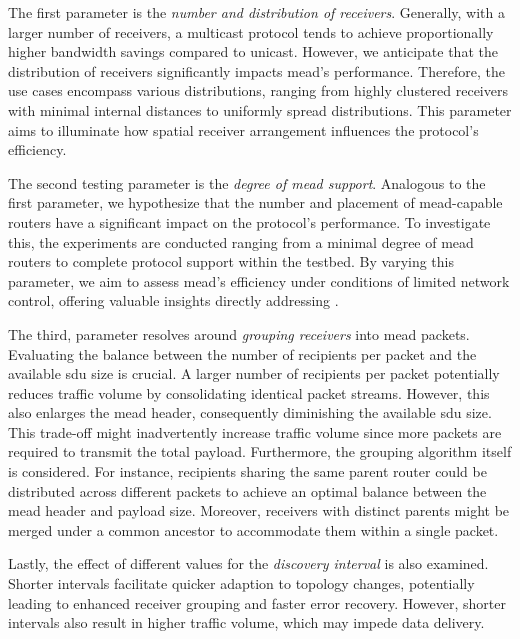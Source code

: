 The first parameter is the \textit{number and distribution of receivers}.
Generally, with a larger number of receivers, a multicast protocol tends to
    achieve proportionally higher bandwidth savings compared to unicast.
However, we anticipate that the distribution of receivers significantly impacts
    \gls{mead}'s performance.
Therefore, the use cases encompass various distributions, ranging from highly
    clustered receivers with minimal internal distances to uniformly spread
    distributions.
This parameter aims to illuminate how spatial receiver arrangement influences
    the protocol's efficiency.

The second testing parameter is the \textit{degree of \gls{mead} support}.
Analogous to the first parameter, we hypothesize that the number and placement
    of \gls{mead}-capable routers have a significant impact on the protocol's
    performance.
To investigate this, the experiments are conducted ranging from a minimal
    degree of \gls{mead} routers to complete protocol support within the testbed.
By varying this parameter, we aim to assess \gls{mead}'s efficiency under
    conditions of limited network control, offering valuable insights
    directly addressing \textit{\rqiv{}}.

The third, parameter resolves around \textit{grouping receivers} into \gls{mead}
    packets.
Evaluating the balance between the number of recipients per packet and the
    available \gls{sdu} size is crucial.
A larger number of recipients per packet potentially reduces traffic volume by
    consolidating identical packet streams.
However, this also enlarges the \gls{mead} header, consequently diminishing the
    available \gls{sdu} size.
This trade-off might inadvertently increase traffic volume since more packets
    are required to transmit the total payload.
Furthermore, the grouping algorithm itself is considered.
For instance, recipients sharing the same parent router could be distributed
    across different packets to achieve an optimal balance between the \gls{mead}
    header and payload size.
Moreover, receivers with distinct parents might be merged under a common
    ancestor to accommodate them within a single packet.

Lastly, the effect of different values for the \textit{discovery interval} is
    also examined.
Shorter intervals facilitate quicker adaption to topology changes,
    potentially leading to enhanced receiver grouping and faster error
    recovery.
However, shorter intervals also result in higher traffic volume, which may
    impede data delivery.

